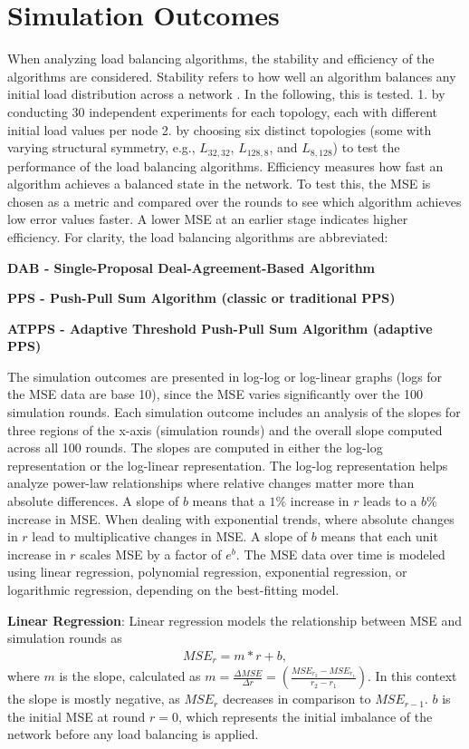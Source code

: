 \chapter{Simulation Outcomes}\label{chap:simulationoutcomes}
When analyzing load balancing algorithms, the stability and efficiency of the algorithms are considered. Stability refers to how well an algorithm balances any initial load distribution across a network \cite{ChengzhongFrancis}. In the following, this is tested. 1. by conducting 30 independent experiments for each topology, each with different initial load values per node 2. by choosing six distinct topologies (some with varying structural symmetry, e.g., $L_{32,32}$, $L_{128,8}$, and $L_{8,128}$) to test the performance of the load balancing algorithms. Efficiency measures how fast an algorithm achieves a balanced state in the network. To test this, the MSE is chosen as a metric and compared over the rounds to see which algorithm achieves low error values faster. A lower MSE at an earlier stage indicates higher efficiency. For clarity, the load balancing algorithms are abbreviated:

\textbf{DAB - Single-Proposal Deal-Agreement-Based Algorithm}

\textbf{PPS - Push-Pull Sum Algorithm (classic or traditional PPS)}

\textbf{ATPPS - Adaptive Threshold Push-Pull Sum Algorithm (adaptive PPS)}

The simulation outcomes are presented in log-log or log-linear graphs (logs for the MSE data are base 10), since the MSE varies significantly over the 100 simulation rounds. Each simulation outcome includes an analysis of the slopes for three regions of the x-axis (simulation rounds) and the overall slope computed across all 100 rounds. The slopes are computed in either the log-log representation or the log-linear representation. The log-log representation helps analyze power-law relationships where relative changes matter more than absolute differences. A slope of $b$ means that a $1\%$ increase in $r$ leads to a $b\%$ increase in MSE. When dealing with exponential trends, where absolute changes in $r$ lead to multiplicative changes in MSE. A slope of $b$ means that each unit increase in $r$ scales MSE by a factor of $e^{b}$. The MSE data over time is modeled using linear regression, polynomial regression, exponential regression, or logarithmic regression, depending on the best-fitting model.

\textbf{Linear Regression}: Linear regression models the relationship between MSE and simulation rounds as 
\begin{align}
    MSE_r=m*r+b,    
\end{align}
where $m$ is the slope, calculated as $m=\frac{\Delta MSE}{\Delta r}=(\frac{MSE_{r_2}-MSE_{r_1}}{r_2 - r_1})$. In this context the slope is mostly negative, as $MSE_r$ decreases in comparison to $MSE_{r-1}$. $b$ is the initial MSE at round $r=0$, which represents the initial imbalance of the network before any load balancing is applied.

